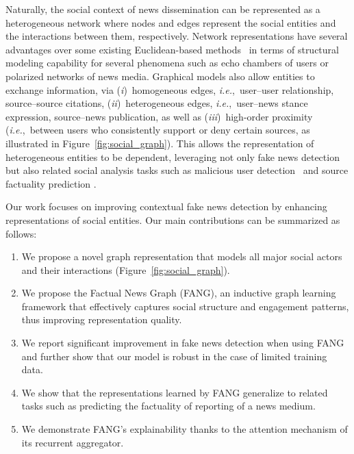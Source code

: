 \documentclass[sigconf]{acmart}
\theoremstyle{definition}
\theoremstyle{hypothesis}
\begin{document}
Naturally, the social context of news dissemination can be represented as a heterogeneous network where nodes and edges represent the social entities and the interactions between them, respectively. 
Network representations have several advantages over some existing Euclidean-based methods~\cite{ruchansky2017csi,liu2018early} in terms of structural modeling capability for several phenomena such as
echo chambers of users or polarized networks of news media. Graphical models also allow entities to exchange information, via (\emph{i})~homogeneous edges, \textit{i.e.},~user--user relationship, source--source citations, (\emph{ii})~heterogeneous edges, \textit{i.e.},~user--news stance expression, source--news publication, as well as (\emph{iii})~high-order proximity (\textit{i.e.},~between users who consistently support or deny certain sources, as illustrated in Figure~\ref{fig:social_graph}). This allows the representation of heterogeneous entities to be dependent, leveraging not only fake news detection but also related social analysis tasks such as malicious user detection~\cite{SeminarUsers2017} and source factuality prediction \cite{baly2018predicting}.

Our work focuses on improving contextual fake news detection by enhancing representations of social entities. Our main contributions can be summarized as follows:
\begin{enumerate}
    \item We propose a novel graph representation that models all major social actors and their interactions (Figure~\ref{fig:social_graph}). 
    \item We propose the Factual News Graph (FANG), an inductive graph learning framework that effectively captures social structure and engagement patterns, thus improving representation quality.
    \item We report significant improvement in fake news detection 
    when using FANG and further show that our model is robust in the case of limited training data.
    \item We show that the representations learned by FANG generalize to related tasks such as predicting the factuality of reporting of a news medium.
    \item We demonstrate FANG's explainability thanks to the attention mechanism of its recurrent aggregator.
\end{enumerate}
\end{document}
